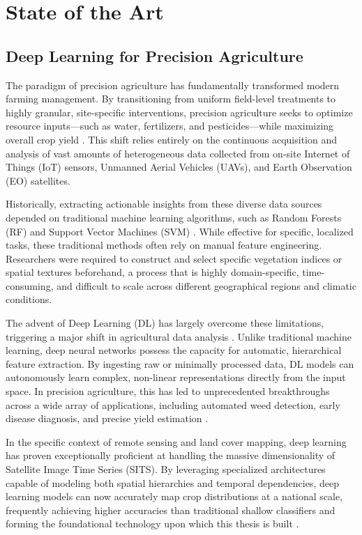\section{State of the Art}
\label{sec:sota}

\subsection{Deep Learning for Precision Agriculture}
\label{subsec:dl_precision_ag}

The paradigm of precision agriculture has fundamentally transformed modern farming management.
By transitioning from uniform field-level treatments to highly granular, site-specific interventions,
precision agriculture seeks to optimize resource inputs---such as water, fertilizers,
and pesticides---while maximizing overall crop yield \cite{precision_farming_1, precision_farming_2}.
This shift relies entirely on the continuous acquisition and analysis of vast amounts of heterogeneous data collected
from on-site Internet of Things (IoT) sensors, Unmanned Aerial Vehicles (UAVs), and Earth Observation (EO) satellites.

Historically, extracting actionable insights from these diverse data sources depended on traditional machine learning algorithms,
such as Random Forests (RF) and Support Vector Machines (SVM) \cite{osman_crop_2013, brickner_field_2025}.
While effective for specific, localized tasks, these traditional methods often rely on manual feature engineering.
Researchers were required to construct and select specific vegetation indices or spatial textures beforehand, a process that is highly domain-specific,
time-consuming, and difficult to scale across different geographical regions and climatic conditions.

The advent of Deep Learning (DL) has largely overcome these limitations, triggering a major shift in agricultural data analysis \cite{kamilaris_deep_2018}.
Unlike traditional machine learning, deep neural networks possess the capacity for automatic, hierarchical feature extraction.
By ingesting raw or minimally processed data, DL models can autonomously learn complex, non-linear representations directly from the input space.
In precision agriculture, this has led to unprecedented breakthroughs across a wide array of applications, including automated weed detection,
early disease diagnosis, and precise yield estimation \cite{kattenborn_review_2021}. 

In the specific context of remote sensing and land cover mapping, deep learning has proven exceptionally proficient at handling the massive
dimensionality of Satellite Image Time Series (SITS). By leveraging specialized architectures capable of modeling both spatial hierarchies
and temporal dependencies, deep learning models can now accurately map crop distributions at a national scale, frequently achieving higher
accuracies than traditional shallow classifiers and forming the foundational technology upon which this thesis is built \cite{kussul_deep_2017}.

